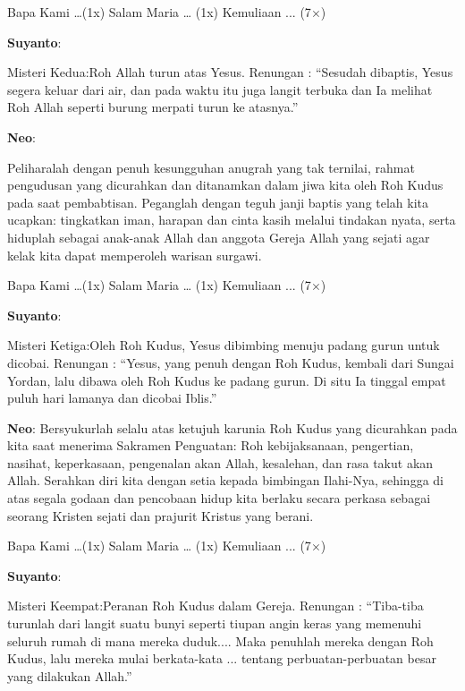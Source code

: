 \documentclass[12pt]{article}
\def\petugasA{\textbf{Suyanto}}
\def\petugasB{\textbf{Neo}}
\begin{document}
 Bapa Kami {\dots}(1x) Salam Maria {\dots} (1x) Kemuliaan ... (7$\times$)

\petugasA:

Misteri Kedua:{\textquotedbl}Roh Allah turun atas Yesus.{\textquotedbl}
Renungan : {\textquotedblleft}Sesudah dibaptis, Yesus segera keluar
dari air, dan pada waktu itu juga langit terbuka dan Ia melihat Roh
Allah seperti burung merpati turun ke atasnya.{\textquotedblright}

\petugasB:

Peliharalah dengan penuh kesungguhan anugrah yang tak ternilai, rahmat
pengudusan yang dicurahkan dan ditanamkan dalam jiwa kita oleh Roh
Kudus pada saat pembabtisan. Peganglah dengan teguh janji baptis yang
telah kita ucapkan: tingkatkan iman, harapan dan cinta kasih melalui
tindakan nyata, serta hiduplah sebagai anak-anak Allah dan anggota
Gereja Allah yang sejati agar kelak kita dapat memperoleh warisan
surgawi.

 Bapa Kami {\dots}(1x) Salam Maria {\dots} (1x) Kemuliaan ... (7$\times$)

\petugasA:

Misteri Ketiga:{\textquotedbl}Oleh Roh Kudus, Yesus dibimbing menuju
padang gurun untuk dicobai.{\textquotedbl} Renungan :
{\textquotedblleft}Yesus, yang penuh dengan Roh Kudus, kembali dari
Sungai Yordan, lalu dibawa oleh Roh Kudus ke padang gurun. Di situ Ia
tinggal empat puluh hari lamanya dan dicobai Iblis.{\textquotedblright}

\petugasB: Bersyukurlah selalu atas ketujuh karunia Roh Kudus yang dicurahkan
pada kita saat menerima Sakramen Penguatan: Roh kebijaksanaan,
pengertian, nasihat, keperkasaan, pengenalan akan Allah, kesalehan, dan
rasa takut akan Allah. Serahkan diri kita dengan setia kepada bimbingan
Ilahi-Nya, sehingga di atas segala godaan dan pencobaan hidup kita
berlaku secara perkasa sebagai seorang Kristen sejati dan prajurit
Kristus yang berani.

Bapa Kami {\dots}(1x) Salam Maria {\dots} (1x) Kemuliaan ... (7$\times$)

\petugasA:

Misteri Keempat:{\textquotedbl}Peranan Roh Kudus dalam
Gereja.{\textquotedbl} Renungan : {\textquotedblleft}Tiba-tiba turunlah
dari langit suatu bunyi seperti tiupan angin keras yang memenuhi
seluruh rumah di mana mereka duduk.... Maka penuhlah mereka dengan Roh
Kudus, lalu mereka mulai berkata-kata ... tentang perbuatan-perbuatan
besar yang dilakukan Allah.{\textquotedblright}
\end{document}
